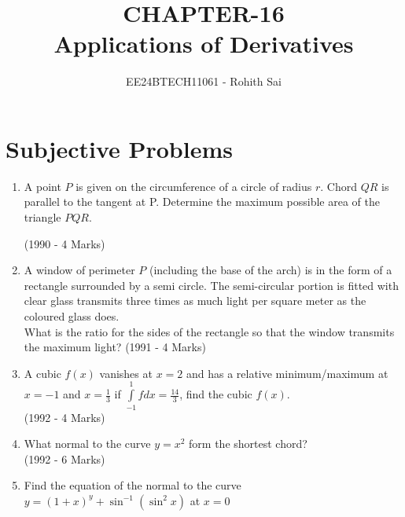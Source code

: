 \documentclass[journal,12pt,twocolumn]{IEEEtran}
\theoremstyle{remark}
\begin{document}

\vspace{3cm}

\title{CHAPTER-16\\Applications of Derivatives}
\author{EE24BTECH11061 - Rohith Sai}
\maketitle
\newpage
\bigskip

\renewcommand{\thefigure}{\theenumi}
\renewcommand{\thetable}{\theenumi}

\section{Subjective Problems}

\begin{enumerate}

\item A point $P$ is given on the circumference of a circle of radius $r$. Chord $QR$ is parallel to the tangent at P. Determine the maximum possible area of the triangle $PQR.$

\hfill (1990 - 4 Marks)\\


\item A window of perimeter $P$ (including the base of the arch) is in the form of a rectangle surrounded by a semi circle. The semi-circular portion is fitted with clear glass transmits three times as much light per square meter as the coloured glass does.\\What is the ratio for the sides of the rectangle so that the window transmits the maximum light?
\hfill {(1991 - 4 Marks)}\\

\item A cubic $f(x)$ vanishes at $x=2$ and has a relative minimum/maximum at $x=-1$ and $x=\frac{1}{3}$ if $\int\limits_{-1}^1 f dx = \frac{14}{3}$, find the cubic $f(x)$.\\
\hfill (1992 - 4 Marks)\\

\item What normal to the curve $y=x^2$ form the shortest chord?\\
\hfill {(1992 - 6 Marks)}\\

\item Find the equation of the normal to the curve $y=(1+x)^y + \sin^{-1}(\sin^2x)$ at $x=0$


\end{enumerate}
\end{document}

